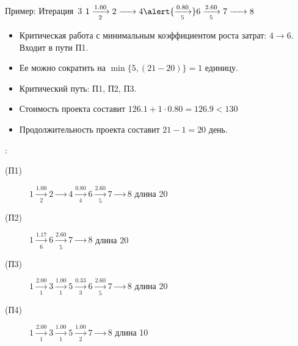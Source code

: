 \documentclass[unicode,11pt,notheorems]{beamer}
\begin{document}
\begin{frame}{Пример: Итерация~3}
	$1 \xrightarrow[2]{1.00}  2 \xrightarrow[]{\phantom{0.25}} 4 \alert{\xrightarrow[5]{0.80}} 6 \xrightarrow[5]{2.60} 7 \xrightarrow[]{\phantom{0.67}} 8$
	\begin{itemize}
	\item 
		Критическая работа с минимальным коэффициентом роста затрат:  $4 \to 6$.
		\hfill Входит в пути \alert{П1}.			
	\item 
		Ее можно сократить на $\min\{5,(21-20)\}=1$ единицу.	
	\item 		
		Критический путь: П1, П2, П3.
	\item 
		Стоимость проекта составит $126.1+1\cdot 0.80=126.9< 130$
	\item 
		Продолжительность проекта составит $21-1=20$ день.		
\end{itemize}
:
\begin{description}
\item[(П1)]
	\alert{$1 \xrightarrow[2]{1.00}  2 \xrightarrow[]{\phantom{0.25}} 4 \xrightarrow[4]{0.80} 6 \xrightarrow[5]{2.60} 7 \xrightarrow[]{\phantom{0.67}} 8$}
	\hfill{} длина 20
\item[(П2)] 
	\alert{$1 \xrightarrow[6]{1.17}  6 \xrightarrow[5]{2.60} 7  \xrightarrow[]{\phantom{0.67}} 8$}
	\hfill{} длина 20
\item[(П3)] 
	\alert{$1 \xrightarrow[1]{2.00} 3 \xrightarrow[1]{1.00} 5 \xrightarrow[3]{0.33}  6 \xrightarrow[5]{2.60} 7  \xrightarrow[]{\phantom{0.67}} 8$}
	\hfill{} длина 20
\item[(П4)] 
	$1 \xrightarrow[1]{2.00} 3 \xrightarrow[1]{1.00} 5 \xrightarrow[2]{1.00} 7  \xrightarrow[]{\phantom{0.67}} 8$
	\hfill{} длина 10
\end{description}

\end{frame}
\end{document}
